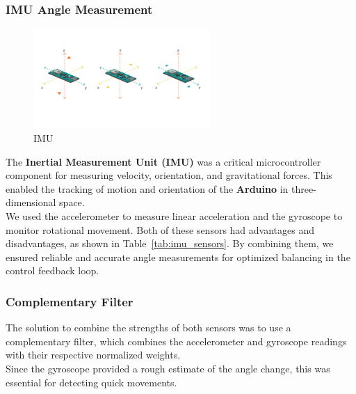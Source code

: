 \documentclass{article}
\begin{document}
\subsubsection{IMU Angle Measurement}
\label{sec:angle}

\begin{figure}[H]
    \centering
    \includegraphics[width=0.6\textwidth]{Figures/imu.png} %
    \caption{IMU}
    \label{fig:imu}
\end{figure}

\begin{minipage}{\linewidth}
    The \textbf{Inertial Measurement Unit (IMU)} was a critical microcontroller component for measuring velocity, orientation, and
    gravitational forces. This enabled the tracking of motion and orientation of the \textbf{Arduino} in three-dimensional space. \\

    We used the accelerometer to measure linear acceleration and the gyroscope to monitor rotational
    movement. Both of these sensors had advantages and disadvantages, as shown in Table~\ref{tab:imu_sensors}.
    By combining them, we ensured reliable and accurate angle measurements for optimized balancing in the control feedback loop.
\end{minipage}

\subsubsection{Complementary Filter}


\begin{minipage}{\linewidth}
    The solution to combine the strengths of both sensors was to use a complementary filter,
    which combines the accelerometer and gyroscope readings with their respective normalized weights. \\

    Since the gyroscope provided a rough estimate of the angle change, this was essential for detecting quick movements. \\
\end{minipage}
\end{document}
